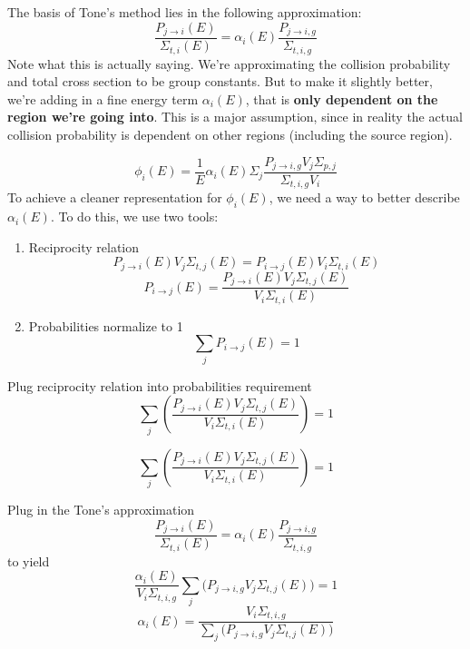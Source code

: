 \documentclass[10pt]{article}
\begin{document}
The basis of Tone's method lies in the following approximation:
\begin{equation}\frac{P_{j\rightarrow i}(E)}{\Sigma_{t,i}(E)}=\alpha_{i}(E)\frac{P_{j\rightarrow i,g}}{\Sigma_{t,i,g}}\end{equation}
Note what this is actually saying. We're approximating the collision probability and total cross section to be group constants. But to make it slightly better, we're adding in a fine energy term $\alpha_i(E)$, that is \textbf{only dependent on the region we're going into}. This is a major assumption, since in reality the actual collision probability is dependent on other regions (including the source region).

\begin{equation*}\phi_{i}(E)=\frac{1}{E}\alpha_{i}(E)\Sigma_j\frac{P_{j\rightarrow i,g}V_{j}\Sigma_{p,j}}{\Sigma_{t,i,g}V_{i}}\end{equation*}
To achieve a cleaner representation for $\phi_i(E)$, we need a way to better describe $\alpha_i(E)$. To do this, we use two tools:
  \begin{enumerate}
    \item Reciprocity relation
      \begin{equation*}P_{j\rightarrow i}(E)V_{j}\Sigma_{t,j}(E)=P_{i\rightarrow j}(E)V_{i}\Sigma_{t,i}(E)\end{equation*}
        \begin{equation*}P_{i\rightarrow j}(E)=\frac{P_{j\rightarrow i}(E)V_{j}\Sigma_{t,j}(E)}{V_{i}\Sigma_{t,i}(E)}\end{equation*}
    \item Probabilities normalize to 1
      \begin{equation*}\sum\limits_{j}P_{i\rightarrow j}(E)=1\end{equation*}
  \end{enumerate}


Plug reciprocity relation into probabilities requirement
      \begin{equation*}\sum\limits_{j}\left(\frac{P_{j\rightarrow i}(E)V_{j}\Sigma_{t,j}(E)}{V_{i}\Sigma_{t,i}(E)}\right)=1\end{equation*}

      \begin{equation*}\sum\limits_{j}\left(\frac{P_{j\rightarrow i}(E)V_{j}\Sigma_{t,j}(E)}{V_{i}\Sigma_{t,i}(E)}\right)=1\end{equation*}

    Plug in the Tone's approximation
    \begin{equation*}\frac{P_{j\rightarrow i}(E)}{\Sigma_{t,i}(E)}=\alpha_{i}(E)\frac{P_{j\rightarrow i,g}}{\Sigma_{t,i,g}}\end{equation*}
      to yield
      \begin{equation*}\frac{\alpha_i(E)}{V_i\Sigma_{t,i,g}}\sum\limits_{j}\Big(P_{j\rightarrow i,g}V_{j}\Sigma_{t,j}(E)\Big)=1\end{equation*}
        \begin{equation*}\alpha_i(E)=\frac{V_i\Sigma_{t,i,g}}{\sum\limits_{j}\Big(P_{j\rightarrow i,g}V_{j}\Sigma_{t,j}(E)\Big)}\end{equation*}
\end{document}
